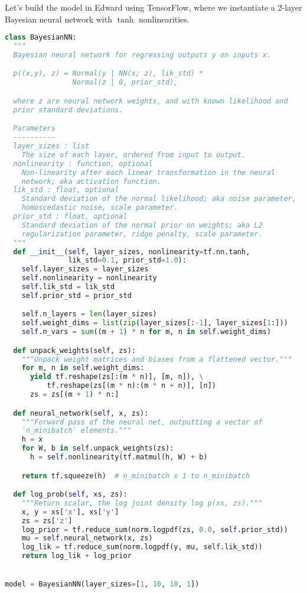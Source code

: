 Let's build the model in Edward using TensorFlow, where we
instantiate a 2-layer Bayesian neural network with $\tanh$
nonlinearities.
\begin{lstlisting}[language=Python]
class BayesianNN:
  """
  Bayesian neural network for regressing outputs y on inputs x.

  p((x,y), z) = Normal(y | NN(x; z), lik_std) *
                Normal(z | 0, prior_std),

  where z are neural network weights, and with known likelihood and
  prior standard deviations.

  Parameters
  ----------
  layer_sizes : list
    The size of each layer, ordered from input to output.
  nonlinearity : function, optional
    Non-linearity after each linear transformation in the neural
    network; aka activation function.
  lik_std : float, optional
    Standard deviation of the normal likelihood; aka noise parameter,
    homoscedastic noise, scale parameter.
  prior_std : float, optional
    Standard deviation of the normal prior on weights; aka L2
    regularization parameter, ridge penalty, scale parameter.
  """
  def __init__(self, layer_sizes, nonlinearity=tf.nn.tanh,
               lik_std=0.1, prior_std=1.0):
    self.layer_sizes = layer_sizes
    self.nonlinearity = nonlinearity
    self.lik_std = lik_std
    self.prior_std = prior_std

    self.n_layers = len(layer_sizes)
    self.weight_dims = list(zip(layer_sizes[:-1], layer_sizes[1:]))
    self.n_vars = sum((m + 1) * n for m, n in self.weight_dims)

  def unpack_weights(self, zs):
    """Unpack weight matrices and biases from a flattened vector."""
    for m, n in self.weight_dims:
      yield tf.reshape(zs[:(m * n)], [m, n]), \
          tf.reshape(zs[(m * n):(m * n + n)], [n])
      zs = zs[(m + 1) * n:]

  def neural_network(self, x, zs):
    """Forward pass of the neural net, outputting a vector of
    `n_minibatch` elements."""
    h = x
    for W, b in self.unpack_weights(zs):
      h = self.nonlinearity(tf.matmul(h, W) + b)

    return tf.squeeze(h)  # n_minibatch x 1 to n_minibatch

  def log_prob(self, xs, zs):
    """Return scalar, the log joint density log p(xs, zs)."""
    x, y = xs['x'], xs['y']
    zs = zs['z']
    log_prior = tf.reduce_sum(norm.logpdf(zs, 0.0, self.prior_std))
    mu = self.neural_network(x, zs)
    log_lik = tf.reduce_sum(norm.logpdf(y, mu, self.lik_std))
    return log_lik + log_prior


model = BayesianNN(layer_sizes=[1, 10, 10, 1])
\end{lstlisting}

